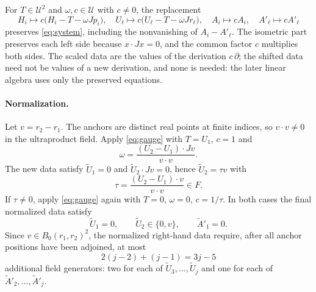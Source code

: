\documentclass[11pt]{article}
\theoremstyle{remark}
\begin{document}
For $T\in\mathcal U^2$ and $\omega,c\in\mathcal U$ with $c\ne0$, the
replacement
\begin{equation}\label{eq:gauge}
 H_i\mapsto c\bigl(H_i-T-\omega Jp_i\bigr),\quad
 U_\ell\mapsto c\bigl(U_\ell-T-\omega Jr_\ell\bigr),\quad
 A_i\mapsto cA_i,\quad A'_\ell\mapsto cA'_\ell
\end{equation}
preserves \eqref{eq:system}, including the nonvanishing of
$A_i-A'_\ell$. The isometric part preserves each left side because
$x\cdot Jx=0$, and the common factor $c$ multiplies both sides. The
scaled data are the values of the derivation $c\,\partial$; the shifted
data need not be values of a new derivation, and none is needed: the
later linear algebra uses only the preserved equations.

\paragraph{Normalization.}
Let $v=r_2-r_1$. The anchors are distinct real points at finite indices,
so $v\cdot v\ne0$ in the ultraproduct field. Apply \eqref{eq:gauge} with
$T=U_1$, $c=1$ and
\[
 \omega=\frac{(U_2-U_1)\cdot Jv}{v\cdot v}.
\]
The new data satisfy $\widetilde U_1=0$ and
$\widetilde U_2\cdot Jv=0$, hence $\widetilde U_2=\tau v$ with
\[
 \tau=\frac{(U_2-U_1)\cdot v}{v\cdot v}\in F .
\]
If $\tau\ne0$, apply \eqref{eq:gauge} again with $T=0$, $\omega=0$,
$c=1/\tau$. In both cases the final normalized data satisfy
\begin{equation}\label{eq:normalized}
 \widetilde U_1=0,\qquad
 \widetilde U_2\in\{0,v\},\qquad
 \widetilde A'_1=0 .
\end{equation}
Since $v\in B_0(r_1,r_2)^2$, the normalized right-hand data require,
after all anchor positions have been adjoined, at most
\begin{equation}\label{eq:cost}
 2(j-2)+(j-1)=3j-5
\end{equation}
additional field generators: two for each of
$\widetilde U_3,\ldots,\widetilde U_j$ and one for each of
$\widetilde A'_2,\ldots,\widetilde A'_j$.
\end{document}
